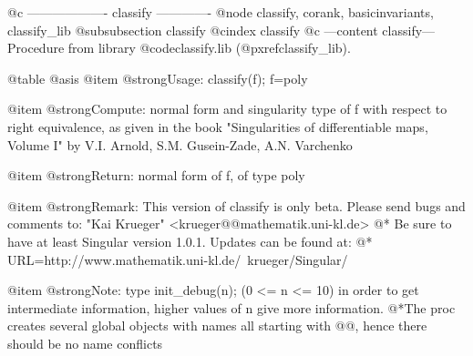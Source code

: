 @c ------------------- classify -------------
@node classify, corank, basicinvariants, classify_lib
@subsubsection classify
@cindex classify
@c ---content classify---
Procedure from library @code{classify.lib} (@pxref{classify_lib}).

@table @asis
@item @strong{Usage:}
classify(f); f=poly

@item @strong{Compute:}
normal form and singularity type of f with respect to right
equivalence, as given in the book "Singularities of differentiable
maps, Volume I" by V.I. Arnold, S.M. Gusein-Zade, A.N. Varchenko

@item @strong{Return:}
normal form of f, of type poly

@item @strong{Remark:}
This version of classify is only beta. Please send bugs and
comments to: "Kai Krueger" <krueger@@mathematik.uni-kl.de> @*
Be sure to have at least Singular version 1.0.1. Updates can be
found at: @*
URL=http://www.mathematik.uni-kl.de/~krueger/Singular/

@item @strong{Note:}
type init_debug(n); (0 <= n <= 10) in order to get intermediate
information, higher values of n give more information.
@*The proc creates several global objects with names all starting
with @@, hence there should be no name conflicts


